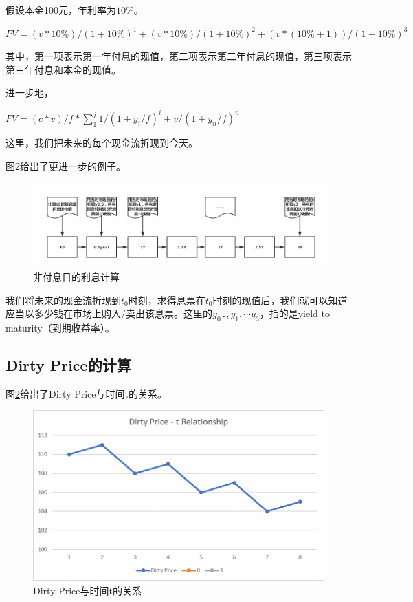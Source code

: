 假设本金100元，年利率为$10\%$。

$PV=(v*10\%)/{(1+10\%)^1} +{(v*10\%)/(1+10\%)}^2 +{(v*(10\%+1))/(1+10\%)}^3 $

其中，第一项表示第一年付息的现值，第二项表示第二年付息的现值，第三项表示第三年付息和本金的现值。

进一步地，

$PV=(c*v)/f*∑_1^j{1/{(1+y_i/f)}^i +v/{(1+y_n/f)}^n} $

这里，我们把未来的每个现金流折现到今天。

图\ref{fig:sys.param}给出了更进一步的例子。
\begin{figure}[htbp]
\begin{center}
\includegraphics[width=16cm]{img//Interest_Calc_Senior.PNG}
\caption{非付息日的利息计算}
\label{fig:sys.param}
\end{center}
\end{figure}

我们将未来的现金流折现到$t_0$时刻，求得息票在$t_0$时刻的现值后，我们就可以知道应当以多少钱在市场上购入/卖出该息票。这里的$y_0.5, y_1, \cdots y_3$，指的是yield to maturity（到期收益率）。

\subsection{Dirty Price的计算}
图\ref{fig:sys.param}给出了Dirty Price与时间t的关系。
\begin{figure}[htbp]
\begin{center}
\includegraphics[width=16cm]{img//DirPri_t_Relation.PNG}
\caption{Dirty Price与时间t的关系}
\label{fig:sys.param}
\end{center}
\end{figure}

